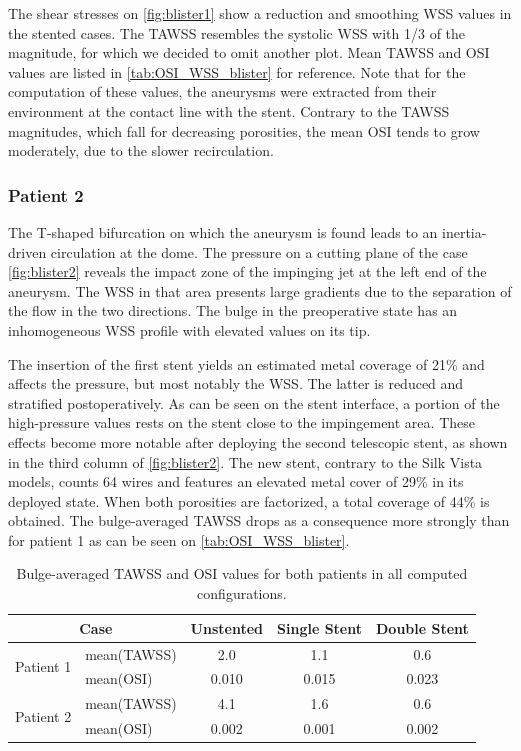 The shear stresses on \autoref{fig:blister1} show a reduction and smoothing WSS values in the stented cases. The TAWSS resembles the systolic WSS with 1/3 of the magnitude, for which we decided to omit another plot. Mean TAWSS and OSI values are listed in \autoref{tab:OSI_WSS_blister} for reference. Note that for the computation of these values, the aneurysms were extracted from their environment at the contact line with the stent. Contrary to the TAWSS magnitudes, which fall for decreasing porosities, the mean OSI tends to grow moderately, due to the slower recirculation.

\subsubsection*{Patient 2}
The T-shaped bifurcation on which the aneurysm is found leads to an inertia-driven circulation at the dome. The pressure on a cutting plane of the case \autoref{fig:blister2} reveals the impact zone of the impinging jet at the left end of the aneurysm. The WSS in that area presents large gradients due to the separation of the flow in the two directions. The bulge in the preoperative state has an inhomogeneous WSS profile with elevated values on its tip.

The insertion of the first stent yields an estimated metal coverage of 21\% and affects the pressure, but most notably the WSS. The latter is reduced and stratified postoperatively. As can be seen on the stent interface, a portion of the high-pressure values rests on the stent close to the impingement area. These effects become more notable after deploying the second telescopic stent, as shown in the third column of \autoref{fig:blister2}. The new stent, contrary to the Silk Vista models, counts 64 wires and features an elevated metal cover of 29\% in its deployed state. When both porosities are factorized, a total coverage of 44\% is obtained. The bulge-averaged TAWSS drops as a consequence more strongly than for patient 1 as can be seen on \autoref{tab:OSI_WSS_blister}.

\begin{table}[htb]
	\centering
	\renewcommand{\arraystretch}{1.3}
	\setlength{\tabcolsep}{6pt}
	\begin{tabular}{l l c c c}
		\hline
		\multicolumn{2}{c}{Case}   & Unstented   & Single Stent & Double Stent         \\
		\hline
		\multirow{2}{*}{Patient 1} & mean(TAWSS) & 2.0          & 1.1          & 0.6   \\

		                           & mean(OSI)   & 0.010        & 0.015        & 0.023 \\
		\hline
		\multirow{2}{*}{Patient 2} & mean(TAWSS) & 4.1          & 1.6          & 0.6   \\
		                           & mean(OSI)   & 0.002        & 0.001        & 0.002 \\
		\hline
	\end{tabular}
	\caption[Bulge TAWSS and OSI]{Bulge-averaged TAWSS and OSI values for both patients in all computed configurations.}\label{tab:OSI_WSS_blister}
\end{table}

